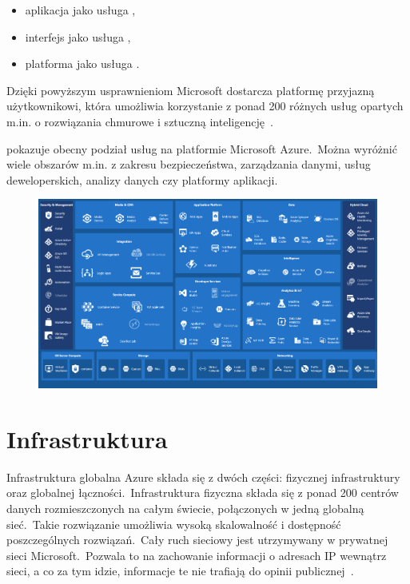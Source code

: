 \begin{itemize}
    \item aplikacja jako usługa ,
    \item interfejs jako usługa ,
    \item platforma jako usługa .
\end{itemize}
Dzięki powyższym usprawnieniom Microsoft dostarcza platformę przyjazną użytkownikowi, która umożliwia korzystanie z ponad 200 różnych usług opartych m.in. o rozwiązania chmurowe i sztuczną inteligencję~\cite{Roosevelt2022, MicrosoftAzurec, Datashift}.

\vfill
\pagebreak

 pokazuje obecny podział usług na platformie Microsoft Azure.\ Można wyróżnić wiele obszarów m.in. z zakresu bezpieczeństwa, zarządzania danymi, usług deweloperskich, analizy danych czy platformy aplikacji.

\begin{figure}[H]
    \includegraphics[width=\textwidth]{images/ms_azure}
    \label{fig:ms-azure}
\end{figure}

\section{Infrastruktura}
Infrastruktura globalna Azure składa się z dwóch części: fizycznej infrastruktury oraz globalnej łączności.\ Infrastruktura fizyczna składa się z ponad 200 centrów danych rozmieszczonych na całym świecie, połączonych w jedną globalną sieć.\ Takie rozwiązanie umożliwia wysoką skalowalność i dostępność poszczególnych rozwiązań.\ Cały ruch sieciowy jest utrzymywany w prywatnej sieci Microsoft.\ Pozwala to na zachowanie informacji o adresach IP wewnątrz sieci, a co za tym idzie, informacje te nie trafiają do opinii publicznej~\cite{MicrosoftAzureb}.\\ \\


